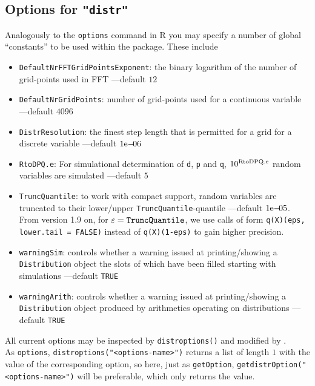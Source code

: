\documentclass[11pt]{article}
\newcommand{\code}[1]{{\tt #1}}
\newcommand{\pkg}[1]{{\tt "#1"}}
\begin{document}
\subsection[Options for distr]{Options for \pkg{distr}}
Analogously to the \code{options} command in {\sf R} you may specify a number of
global ``constants'' to be used within the package. These include
\begin{itemize}
  \item \code{DefaultNrFFTGridPointsExponent}: the binary logarithm of the 
        number of grid-points used in FFT ---default $12$
  \item \code{DefaultNrGridPoints}: number of grid-points used for a continuous 
        variable ---default $4096$
  \item \code{DistrResolution}: the finest step length that is permitted for a 
        grid for a discrete variable ---default $1{\rm e-}\!06$
  \item \code{RtoDPQ.e}: For simulational determination of \code{d}, \code{p} 
         and \code{q}, $10^{\rm RtoDPQ.e}$ random variables are
  simulated ---default $5$
  \item \code{TruncQuantile}: to work with compact support, random variables are 
        truncated to their lower/upper
  \code{TruncQuantile}-quantile   ---default $1{\rm e-}\!05$.\\
  From version 1.9 on, for $\varepsilon={\tt \code{TruncQuantile}}$, we use calls of form 
  \code{q(X)(eps, lower.tail = FALSE)} instead of   \code{q(X)(1-eps)} to gain higher
  precision.
  \item \code{warningSim}: controls whether a warning issued at printing/showing 
        a \code{Distribution} object the slots of which have been
  filled starting with simulations ---default \code{TRUE}
  \item \code{warningArith}: controls whether a warning issued at
   printing/showing a \code{Distribution} object produced by arithmetics
  operating on distributions ---default \code{TRUE}
\end{itemize}
All current options may be inspected by \code{distroptions()}  and modified by
 \linebreak[4] \code{distroptions("<options-name>"=<value>)}.\\
As \code{options},  \code{distroptions("<options-name>")} returns a list of
 length $1$ with the value of the corresponding option,
so here, just as \code{getOption},  \code{getdistrOption("<options-name>")} will
 be preferable, which only returns the value.
\end{document}
